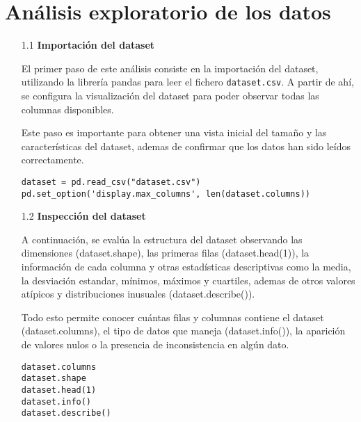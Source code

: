 \documentclass{article}
\begin{document}

\newpage

\section[1]{An\'alisis exploratorio de los datos}

\bigskip

\begin{itemize}

\item[1.1]  {\bf Importaci\'on del dataset}

El primer paso de este an\'alisis consiste en la importaci\'on del dataset, utilizando la librer\'ia pandas para leer el fichero \texttt{dataset.csv}. A partir de ah\'i, se configura la visualizaci\'on del dataset para poder observar todas las columnas disponibles.

Este paso es importante para obtener una vista inicial del tamaño y las caracter\'isticas del dataset, ademas de confirmar que los datos han sido le\'idos correctamente.

\begin{tcolorbox}[width=14cm]
\begin{scriptsize}
\begin{verbatim}
dataset = pd.read_csv("dataset.csv")
pd.set_option('display.max_columns', len(dataset.columns))
\end{verbatim}
\end{scriptsize}
\end{tcolorbox}

\end{itemize}

\bigskip

\begin{itemize}

\item[1.2]  {\bf Inspecci\'on del dataset}

A continuaci\'on, se eval\'ua la estructura del dataset observando las dimensiones (dataset.shape), las primeras filas (dataset.head(1)), la informaci\'on de cada columna y otras estad\'isticas descriptivas como la media, la desviaci\'on estandar, m\'inimos, m\'aximos y cuartiles, ademas de otros valores at\'ipicos y distribuciones inusuales (dataset.describe()).

Todo esto permite conocer cu\'antas filas y columnas contiene el dataset (dataset.columns), el tipo de datos que maneja (dataset.info()), la aparici\'on de valores nulos o la presencia de inconsistencia en alg\'un dato.

\begin{tcolorbox}[width=14cm]
\begin{scriptsize}
\begin{verbatim}
dataset.columns
dataset.shape
dataset.head(1)
dataset.info()
dataset.describe()
\end{verbatim}
\end{scriptsize}
\end{tcolorbox}

\end{itemize}
\end{document}
